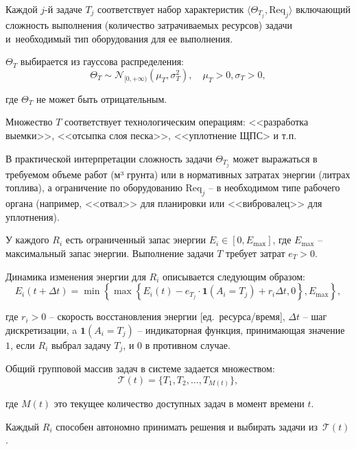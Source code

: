 Каждой $j$-й задаче $T_j$ соответствует набор характеристик $\langle \Theta_{T_j}, \text{Req}_j \rangle$ включающий сложность выполнения (количество затрачиваемых ресурсов) задачи и~необходимый тип оборудования для ее выполнения.

$\Theta_T$ выбирается из гауссова распределения:
\begin{equation}
	\label{eq:theta_gauss}
	\Theta_T \sim \mathcal{N}_{[0, +\infty)}(\mu_T, \sigma_T^2), \quad \mu_T > 0, \sigma_T > 0,
\end{equation}

где $\Theta_T$ не может быть отрицательным.

Множество $T$ соответствует технологическим операциям: <<разработка выемки>>, <<отсыпка слоя песка>>, <<уплотнение ЩПС> и т.п.

В практической интерпретации сложность задачи $\Theta_{T_j}$ может выражаться в требуемом объеме работ (м³ грунта) или в нормативных затратах энергии (литрах топлива), а ограничение по оборудованию $\text{Req}_j$ -- в необходимом типе рабочего органа (например, <<отвал>> для планировки или <<вибровалец>> для уплотнения).

У каждого $R_i$ есть ограниченный запас энергии $E_i \in [0, E_{\text{max}}]$, где $E_{\text{max}}$ -- максимальный запас энергии. Выполнение задачи $T$ требует затрат $e_T > 0$.

Динамика изменения энергии для $R_i$ описывается следующим образом:
\begin{equation}
	\label{eq:energy_ntts}
	E_i(t+\Delta t) = \min\left\{ \max\left\{ E_i(t) - e_{T_j} \cdot \mathbf{1}(A_i = T_j) + r_i \Delta t,  0 \right\}, E_{\text{max}} \right\},
\end{equation}

где $r_i > 0$ -- скорость восстановления энергии [ед.\ ресурса/время], $\Delta t$ -- шаг дискретизации, a $\mathbf{1}(A_i = T_j)$ -- индикаторная функция, принимающая значение $1$, если $R_i$ выбрал задачу $T_j$, и $0$ в противном случае.

Общий групповой массив задач в системе задается множеством:
\begin{equation}
	\label{eq:global_queue}
	\mathcal{T}(t) = \{ T_1, T_2, \dotsc, T_{M(t)} \},
\end{equation}

где $M(t)$ это текущее количество доступных задач в момент времени $t$.

Каждый $R_i$ способен автономно принимать решения и выбирать задачи из~$\mathcal{T}(t)$.

